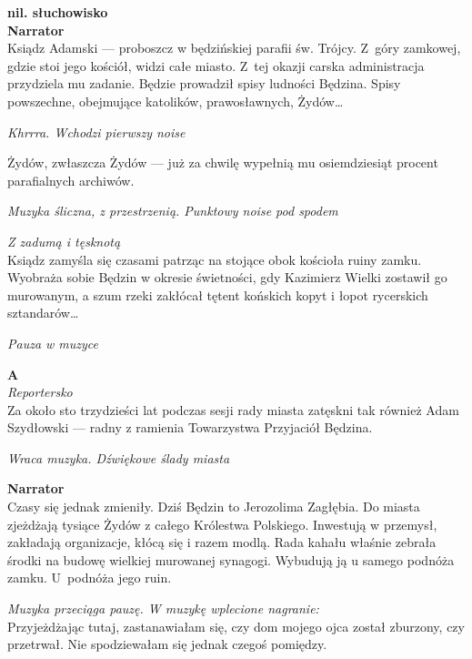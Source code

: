\documentclass[11pt,a4paper,oneside]{article}
\begin{document}
\noindent
\textbf{nil. słuchowisko}\\

\textbf{Narrator}\\
Ksiądz Adamski --- proboszcz w będzińskiej parafii św. Trójcy.
Z~góry zamkowej, gdzie stoi jego kościół, widzi całe miasto.  Z~tej
okazji carska administracja przydziela mu zadanie. Będzie prowadził
spisy ludności Będzina.  Spisy powszechne, obejmujące katolików,
prawosławnych, Żydów\dots{} 

{\color{light-gray} \emph{Khrrra. Wchodzi pierwszy noise}}

Żydów, zwłaszcza Żydów --- już za chwilę wypełnią mu osiemdziesiąt procent
parafialnych archiwów. 

{\color{light-gray} \emph{Muzyka śliczna, z przestrzenią. Punktowy noise pod spodem}}

{\color{light-gray} \emph{Z zadumą i tęsknotą}} \\
Ksiądz zamyśla się czasami patrząc na stojące obok kościoła ruiny
zamku.  Wyobraża sobie Będzin w okresie świetności, gdy Kazimierz
Wielki zostawił go murowanym, a szum rzeki zakłócał tętent końskich
kopyt i łopot rycerskich sztandarów\dots{}

{\color{light-gray} \emph{Pauza w muzyce}}

\textbf{A}\\
{\color{light-gray} \emph{Reportersko}}\\
Za około sto trzydzieści lat podczas sesji rady miasta zatęskni tak również Adam
Szydłowski --- radny z ramienia Towarzystwa Przyjaciół Będzina.

{\color{light-gray} \emph{Wraca muzyka. Dźwiękowe ślady miasta}}

\textbf{Narrator}\\
Czasy się jednak zmieniły. Dziś Będzin to Jerozolima Zagłębia. 
Do miasta zjeżdżają tysiące Żydów z całego Królestwa Polskiego.
Inwestują w przemysł, zakładają organizacje, kłócą się i razem modlą.
Rada kahału właśnie zebrała środki na budowę wielkiej murowanej
synagogi. Wybudują ją u samego podnóża zamku. U~podnóża jego ruin.

{\color{light-gray} \emph{Muzyka przeciąga pauzę. W muzykę wplecione
nagranie:}}\\
Przyjeżdżając tutaj, zastanawiałam się, czy dom mojego ojca został
zburzony, czy przetrwał. Nie spodziewałam się jednak czegoś pomiędzy.
\end{document}
